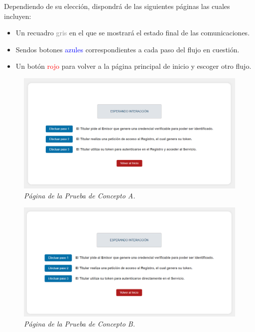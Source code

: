 \documentclass[../main.tex]{subfiles}
\begin{document}
\noindent Dependiendo de su elección, dispondrá de las siguientes páginas las cuales incluyen: 
\begin{itemize}
    \item Un recuadro \textcolor{gray}{gris} en el que se mostrará el estado final de las comunicaciones.
    \item Sendos botones \textcolor{blue}{azules} correspondientes a cada paso del flujo en cuestión.
    \item Un botón \textcolor{red}{rojo} para volver a la página principal de inicio y escoger otro flujo.
\end{itemize}

\begin{figure}[htbp]
    \centering
    \includegraphics[width=0.9\linewidth]{images/design/PoCA.png}
    \caption{\textit{Página de la Prueba de Concepto A.}}
\end{figure}

\begin{figure}[htbp]
    \centering
    \includegraphics[width=0.9\linewidth]{images/design/PoCB.png}
    \caption{\textit{Página de la Prueba de Concepto B.}}
\end{figure}

\newpage
\end{document}

